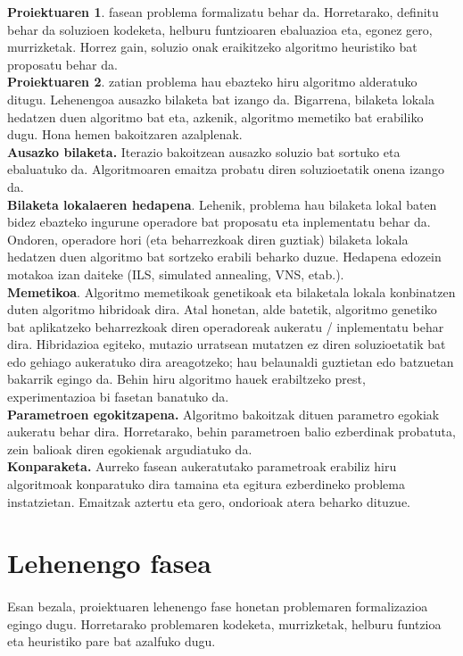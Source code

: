 \documentclass[eu,gi]{ifirak}\usepackage[]{graphicx}\usepackage[]{color}
\begin{document}
\textbf{Proiektuaren 1}. fasean problema formalizatu behar da. Horretarako, definitu behar da soluzioen kodeketa, helburu funtzioaren ebaluazioa eta, egonez gero, murrizketak. Horrez gain, soluzio onak eraikitzeko algoritmo heuristiko bat proposatu behar da.\\ 
\textbf{Proiektuaren 2}. zatian problema hau ebazteko hiru algoritmo alderatuko ditugu. Lehenengoa ausazko bilaketa bat izango da. Bigarrena, bilaketa lokala hedatzen duen algoritmo bat eta, azkenik, algoritmo memetiko bat erabiliko dugu. Hona hemen bakoitzaren azalplenak. \\
\textbf{Ausazko bilaketa.} Iterazio bakoitzean ausazko soluzio bat sortuko eta ebaluatuko da. Algoritmoaren emaitza probatu diren soluzioetatik onena izango da. \\
\textbf{Bilaketa lokalaeren hedapena}. Lehenik, problema hau bilaketa lokal baten bidez ebazteko ingurune operadore bat proposatu eta inplementatu behar da. Ondoren, operadore hori (eta beharrezkoak diren guztiak) bilaketa lokala hedatzen duen algoritmo bat sortzeko erabili beharko duzue. Hedapena edozein motakoa izan daiteke (ILS, simulated annealing, VNS, etab.). \\
\textbf{Memetikoa}. Algoritmo memetikoak genetikoak eta bilaketala lokala konbinatzen duten algoritmo hibridoak dira. Atal honetan, alde batetik, algoritmo genetiko bat aplikatzeko beharrezkoak diren operadoreak aukeratu / inplementatu behar dira. Hibridazioa egiteko, mutazio urratsean mutatzen ez diren soluzioetatik bat edo gehiago aukeratuko dira areagotzeko; hau belaunaldi guztietan edo batzuetan bakarrik egingo da. Behin hiru algoritmo hauek erabiltzeko prest, experimentazioa bi fasetan banatuko da.\\
\textbf{Parametroen egokitzapena.} Algoritmo bakoitzak dituen parametro egokiak aukeratu behar dira. Horretarako, behin parametroen balio ezberdinak probatuta, zein balioak diren egokienak argudiatuko da. \\
\textbf{Konparaketa.} Aurreko fasean aukeratutako parametroak erabiliz hiru algoritmoak konparatuko dira tamaina eta egitura ezberdineko problema instatzietan. Emaitzak aztertu eta gero, ondorioak atera beharko dituzue. \\

\pagebreak

\section{Lehenengo fasea}
\paragraph{}
Esan bezala, proiektuaren lehenengo fase honetan problemaren formalizazioa egingo dugu. Horretarako problemaren kodeketa, murrizketak, helburu funtzioa eta heuristiko pare bat azalfuko dugu.
\end{document}
